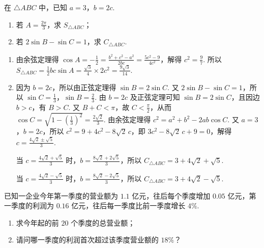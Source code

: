 \begin{problem}
在 \(\triangle ABC\) 中，已知 \(a=3\)，\(b=2c\).

\begin{enumerate}
\item 若 \(A=\frac{2\pi}{3}\)，求 \(S_{\triangle ABC}\)；
\item 若 \(2\sin B-\sin C=1\)，求 \(C_{\triangle ABC}\).
\end{enumerate}
\end{problem}

\begin{solution}
\begin{enumerate}
\item 由余弦定理得 \(\cos A=-\frac12=\frac{b^2+c^2-a^2}{2bc}=\frac{5c^2-9}{4c^2}\)，解得 \(c^2=\frac97\). 所以 \(S_{\triangle ABC}=\frac12bc\sin A=\frac{\sqrt3}{4}\times 2c^2=\frac{9\sqrt3}{14}\).

\item 因为 \(b=2c\)，所以由正弦定理得 \(\sin B=2\sin C\). 又 \(2\sin B-\sin C=1\)，所以 \(\sin C=\frac13\)，\(\sin B=\frac23\). 由 \(b=2c\) 及正弦定理可知 \(\sin B=2\sin C\)，且因边 \(b>c\)，有 \(B>C\). 又 \(B+C<\pi\)，故 \(C<\frac\pi2\)，从而 \(\cos C=\sqrt{1-\left( \frac13 \right)^2}=\frac{2\sqrt2}{3}\). 由余弦定理得 \(c^2=a^2+b^2-2ab\cos C\). 又 \(a=3\)，\(b=2c\)，所以 \(c^2=9+4c^2-8\sqrt2\,c\)，即 \(3c^2-8\sqrt2\,c+9=0\)，解得 \(c=\frac{4\sqrt2\pm \sqrt5}{3}\).

当 \(c=\frac{4\sqrt2+\sqrt5}{3}\) 时，\(b=\frac{8\sqrt2+2\sqrt5}{3}\)，所以 \(C_{\triangle ABC}=3+4\sqrt2+\sqrt5\).

当 \(c=\frac{4\sqrt2-\sqrt5}{3}\) 时，\(b=\frac{8\sqrt2-2\sqrt5}{3}\)，所以 \(C_{\triangle ABC}=3+4\sqrt2-\sqrt5\).
\end{enumerate}
\end{solution}

\begin{problem}
已知一企业今年第一季度的营业额为 \(1.1\) 亿元，往后每个季度增加 \(0.05\) 亿元，第一季度的利润为 \(0.16\) 亿元，往后每一季度比前一季度增长 \(4\%\).

\begin{enumerate}
\item 求今年起的前 \(20\) 个季度的总营业额；
\item 请问哪一季度的利润首次超过该季度营业额的 \(18\%\)？
\end{enumerate}
\end{problem}

